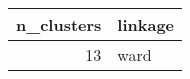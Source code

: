 \begin{tabular}{rl}
\toprule
n_clusters & linkage \\
\midrule
13 & ward \\
\bottomrule
\end{tabular}
